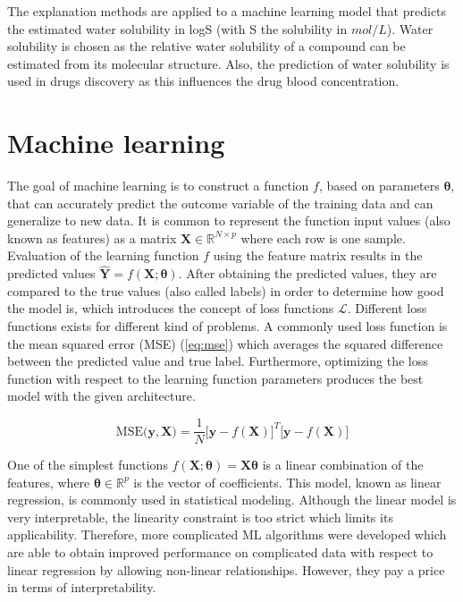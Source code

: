 The explanation methods are applied to a machine learning model that predicts the 
estimated water solubility in logS (with S the solubility in $mol/L$). Water 
solubility is chosen as the relative water solubility of a compound can be estimated 
from its molecular structure. Also, the prediction of water solubility is used 
in drugs discovery as this influences the drug blood concentration.\cite{hill2010getting}


\section{Machine learning}

The goal of machine learning is to construct a function $f$, based on parameters
$\pmb{\theta}$, that can accurately predict the outcome variable of the training
data and can generalize to new data.\cite{hastie2009elements} It is common to represent the function input
values (also known as features) as a matrix $\mathbf{X} \in \mathbb{R}^{N \times p}$ where
each row is one sample. Evaluation of the learning function $f$ using the feature matrix
results in the predicted values $\mathbf{\hat{Y}} = f(\mathbf{X}; \pmb{\theta})$. After
obtaining the predicted values, they are compared to the true values (also called labels)
in order to determine how good the model is, which introduces the concept of loss functions $\mathcal{L}$.
Different loss functions exists for different kind of problems.\cite{wang2020comprehensive}
A commonly used loss function is the mean squared error (MSE) (\cref{eq:mse})
which averages the squared difference between the predicted value and true label.
Furthermore, optimizing the loss function with respect to the learning function
parameters produces the best model with the given architecture.\cite{hastie2009elements}


\begin{equation}
	\label{eq:mse}
	\text{MSE}\big(\pmb{y}, \pmb{X}\big) = \frac{1}{N}  \big[\pmb{y} - f(\mathbf{X})\big]^T[\pmb{y} - f(\mathbf{X})\big]
\end{equation}


One of the simplest functions $f\left(\mathbf{X}; \pmb{\theta}\right) = \mathbf{X}\pmb{\theta}$
is a linear combination of the features, where $\pmb{\theta} \in \mathbb{R}^p$
is the vector of coefficients. This model, known as linear regression, is commonly
used in statistical modeling.\cite{kutner2005applied} Although the linear model is
very interpretable, the linearity constraint is too strict which limits its
applicability. Therefore, more complicated ML algorithms were developed which are
able to obtain improved performance on complicated data with respect to linear
regression by allowing non-linear relationships.\cite{deng2012mnist} However,
they pay a price in terms of interpretability.\cite{fan2021interpretability}


